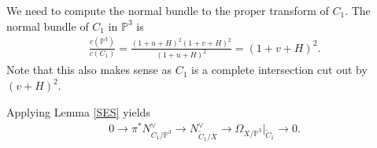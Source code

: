 \documentclass[12 pt, reqno]{amsart}
\theoremstyle{definition}
\newcommand{\mb}{\mathbb}
\newcommand{\ms}{\mathscr}
\newcommand{\wt}{\widetilde}
\begin{document}
We need to compute the normal bundle to the proper transform of
$C_1$. The normal bundle of $C_1$ in $\mb{P}^3$ is
\begin{align*}
\frac{c(\mb{P}^3)}{c(C_1)}=\frac{(1+u+H)^2(1+v+H)^2}{(1+u+H)^2}=(1+v+H)^2.
\end{align*}
Note that this also makes sense as $C_1$ is a complete intersection
cut out by $(v+H)^2$.

Applying Lemma \ref{SES} yields 
\begin{align*}
0\to \pi^{*}N_{C_1/\mb{P}^3}^\vee\to N_{\wt{C}_1/X}^\vee\to \Omega_{X/\mb{P}^3}|_{\wt{C}_1}\to 0.
\end{align*}
\end{document}

